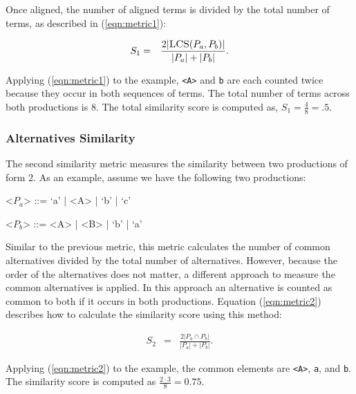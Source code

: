 \documentclass[conference]{IEEEtran}
\begin{document}
Once aligned, the number of aligned terms is divided by the total number
of terms, as described in (\ref{eqn:metric1}):

\begin{eqnarray}\label{eqn:metric1}
S_1 & = & \frac{2|\textsc{LCS}(P_a, P_b)|}{|P_a| + |P_b|}.
\end{eqnarray}

\noindent Applying (\ref{eqn:metric1}) to the example,
\texttt{\textless{}A\textgreater{}} and
\texttt{\textquotesingle{}b\textquotesingle{}} are each counted twice
because they occur in both sequences of terms. The total number of terms
across both productions is 8. The total similarity score is computed as,
\(S_1 = \frac{4}{8} = .5\).

\hypertarget{alternatives-similarity}{%
\subsubsection{Alternatives Similarity}\label{alternatives-similarity}}

The second similarity metric measures the similarity between two
productions of form 2. As an example, assume we have the following two
productions:

\begin{grammar}
<\(P_a\)> ::= `a' | <A> | `b' | `c'

<\(P_b\)> ::= <A> | <B> | `b' | `a'

\end{grammar}

Similar to the previous metric, this metric calculates the number of
common alternatives divided by the total number of alternatives.
However, because the order of the alternatives does not matter, a
different approach to measure the common alternatives is applied. In
this approach an alternative is counted as common to both if it occurs
in both productions. Equation (\ref{eqn:metric2}) describes how to
calculate the similarity score using this method:

\begin{eqnarray}\label{eqn:metric2}
S_2 & = & \frac{2|P_a \cap P_b|}{|P_a| + |P_b|}.
\end{eqnarray}

\noindent Applying (\ref{eqn:metric2}) to the example, the common
elements are \texttt{\textless{}A\textgreater{}},
\texttt{\textquotesingle{}a\textquotesingle{}}, and
\texttt{\textquotesingle{}b\textquotesingle{}}. The similarity score is
computed as \(\frac{2\cdot 3}{8} = 0.75.\)
\end{document}
